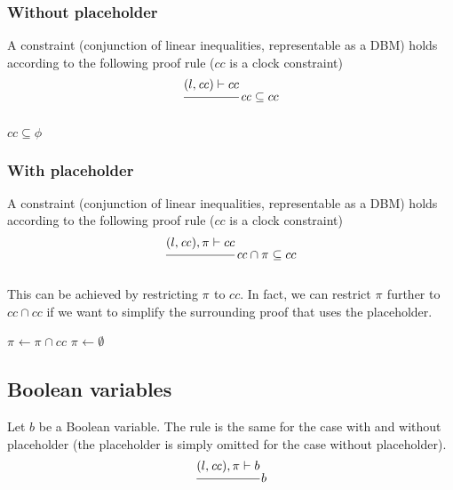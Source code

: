 \documentclass{article}
\newcommand{\proofrule}[3][]{#1 \frac{\raisebox{.7ex}{\normalsize{$#2$}}}
  {\raisebox{-1.0ex}{\normalsize{$#3$}}}}
\newcommand{\placeholder}[1][]{\pi_{#1}}
\newcommand{\loc}{l}
\newcommand{\region}{\mathit{cc}}
\newcommand{\method}[1]{\ensuremath{\mathbf{#1}}}
\begin{document}
\subsubsection{Without placeholder}
A constraint (conjunction of linear inequalities, representable as a DBM) holds according to the following proof rule ($cc$ is a clock constraint)
\[
  \proofrule
  {(\loc, \region) \vdash cc}
  {}
  \region \subseteq cc
\]

\begin{algorithm}[H]
  \caption{$\method{do\_proof\_constraint}(\loc, \region, \phi)$}
  \begin{algorithmic}
  \RETURN $\region \subseteq \phi$
\end{algorithmic}
\end{algorithm}

\subsubsection{With placeholder}
A constraint (conjunction of linear inequalities, representable as a DBM) holds according to the following proof rule ($cc$ is a clock constraint)
\[
  \proofrule
  {(\loc, \region), \placeholder \vdash cc}
  {}
  \region \cap \placeholder \subseteq cc
\]

This can be achieved by restricting $\placeholder$ to $cc$. In fact, we can restrict $\placeholder$ further to $cc \cap \region$ if we want to simplify the surrounding proof that uses the placeholder.
\begin{algorithm}[H]
  \caption{$\method{do\_proof\_place\_constraint}(\loc, \region, \placeholder, \phi)$}
  \begin{algorithmic}
  \IF{$\region \not \subseteq cc$}
    \STATE $\placeholder \gets \placeholder \cap cc$
    \IF{$\placeholder \cap \region = \emptyset$}
      \STATE $\placeholder \gets \emptyset$
    \ENDIF
  \ENDIF
\end{algorithmic}
\end{algorithm}


\subsection{Boolean variables}

Let $b$ be a Boolean variable. The rule is the same for the case with and without placeholder (the placeholder is simply omitted for the case without placeholder).
\[
  \proofrule
  {(\loc, \region), \placeholder \vdash b}
  {}
  b
\]
\end{document}
